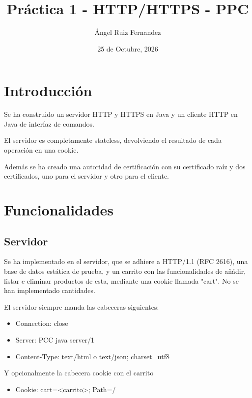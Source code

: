 \documentclass[12pt]{article}
\title{Práctica 1 - HTTP/HTTPS - PPC}
\date{25 de Octubre, 2026}
\author{Ángel Ruiz Fernandez}
\begin{document}
    \maketitle
    \pagebreak

    \tableofcontents
    \pagebreak

    \section{Introducción}

    Se ha construido un servidor HTTP y HTTPS en Java y un cliente HTTP en Java
    de interfaz de comandos.

    El servidor es completamente stateless, devolviendo el resultado de cada
    operación en una cookie.

    Además se ha creado una autoridad de certificación con su certificado raíz y
    dos certificados, uno para el servidor y otro para el cliente.

    \section{Funcionalidades}

    \subsection{Servidor}

    Se ha implementado en el servidor, que se adhiere a HTTP/1.1 (RFC 2616), una base de datos estática de prueba,
    y un carrito con las funcionalidades de añádir, listar e eliminar productos
    de esta, mediante una cookie llamada "cart". No se han implementado cantidades.

    El servidor siempre manda las cabeceras siguientes:
    \begin{itemize}
    \item Connection: close
    \item Server: PCC java server/1
    \item Content-Type: text/html o text/json; charset=utf8
    \end{itemize}

    Y opcionalmente la cabecera cookie con el carrito
    \begin{itemize}
    \item Cookie: cart=\textless carrito\textgreater; Path=/
    \end{itemize}
\end{document}
